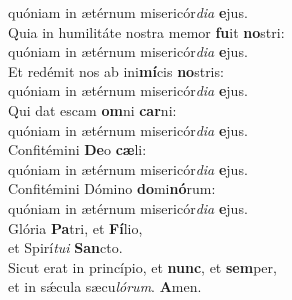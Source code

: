 \oddverse quóniam in ætérnum misericór\textit{di}\textit{a} \textbf{e}jus.\\
\evenverse Quia in humilitáte nostra memor \textbf{fu}it \textbf{no}stri:~\*\\
\evenverse quóniam in ætérnum misericór\textit{di}\textit{a} \textbf{e}jus.\\
\oddverse Et redémit nos ab ini\textbf{mí}cis \textbf{no}stris:~\*\\
\oddverse quóniam in ætérnum misericór\textit{di}\textit{a} \textbf{e}jus.\\
\evenverse Qui dat escam \textbf{om}ni \textbf{car}ni:~\*\\
\evenverse quóniam in ætérnum misericór\textit{di}\textit{a} \textbf{e}jus.\\
\oddverse Confitémini \textbf{De}o \textbf{cæ}li:~\*\\
\oddverse quóniam in ætérnum misericór\textit{di}\textit{a} \textbf{e}jus.\\
\evenverse Confitémini Dómino \textbf{do}mi\textbf{nó}rum:~\*\\
\evenverse quóniam in ætérnum misericór\textit{di}\textit{a} \textbf{e}jus.\\
\oddverse Glória \textbf{Pa}tri, et \textbf{Fí}lio,~\*\\
\oddverse et Spirí\textit{tu}\textit{i} \textbf{San}cto.\\
\evenverse Sicut erat in princípio, et \textbf{nunc}, et \textbf{sem}per,~\*\\
\evenverse et in sǽcula sæcu\textit{ló}\textit{rum}. \textbf{A}men.\\
